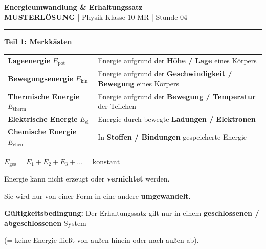 \documentclass[11pt, a4paper]{article}
\newcommand{\fach}{Physik}
\newcommand{\thema}{Energieumwandlung \& Erhaltungssatz}
\newcommand{\klasse}{10 MR}
\newcommand{\stunde}{04}
\newcommand{\lsg}[1]{\textcolor{loesung}{\textbf{#1}}}
\begin{document}

\begin{center}
    {\Large\bfseries\textcolor{fachfarbe}{\thema}}\\[0.2em]
    {\small \textcolor{loesung}{\textbf{MUSTERLÖSUNG}} | \fach{} Klasse \klasse{} | Stunde \stunde}
\end{center}
\vspace{-0.3em}
\hrule
\vspace{0.6em}


\textbf{\large Teil 1: Merkkästen}

\begin{merkkasten}[title={\textbf{Kasten 1: Energieformen}}]
\begin{tabular}{@{}p{3.5cm}p{8cm}@{}}
\textbf{Lageenergie} $E_\text{pot}$ & Energie aufgrund der \lsg{Höhe / Lage} eines Körpers \\[8pt]
\textbf{Bewegungsenergie} $E_\text{kin}$ & Energie aufgrund der \lsg{Geschwindigkeit / Bewegung} eines Körpers \\[8pt]
\textbf{Thermische Energie} $E_\text{therm}$ & Energie aufgrund der \lsg{Bewegung / Temperatur} der Teilchen \\[8pt]
\textbf{Elektrische Energie} $E_\text{el}$ & Energie durch bewegte \lsg{Ladungen / Elektronen} \\[8pt]
\textbf{Chemische Energie} $E_\text{chem}$ & In \lsg{Stoffen / Bindungen} gespeicherte Energie
\end{tabular}
\end{merkkasten}

\begin{merkkasten}[title={\textbf{Kasten 2: Energieerhaltungssatz}}]
\begin{formelkasten}
\centering
\Large $E_\text{ges} = E_1 + E_2 + E_3 + \ldots = \text{konstant}$
\end{formelkasten}

\vspace{4pt}
Energie kann nicht erzeugt oder \lsg{vernichtet} werden.

Sie wird nur von einer Form in eine andere \lsg{umgewandelt}.

\vspace{6pt}
\textbf{Gültigkeitsbedingung:} Der Erhaltungssatz gilt nur in einem \lsg{geschlossenen / abgeschlossenen} System

(= keine Energie fließt von außen hinein oder nach außen ab).
\end{merkkasten}
\end{document}
